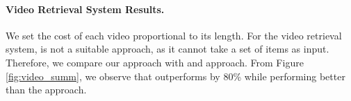 \paragraph{Video Retrieval System Results.} We set the cost of each video proportional to its length.  For the video retrieval system, \gnn is not a suitable approach, as it cannot take a set of items as input. Therefore, we compare our approach with \random{} and \topk{} approach.
From Figure \ref{fig:video_summ}, we observe that \qs outperforms \random{} by 80\% while performing better than the \topk{} approach. 


